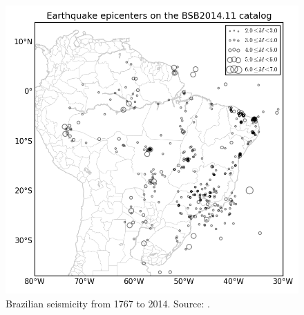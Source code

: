 \documentclass[grl]{agutex}
\begin{document}





\newpage


\begin{figure}
	\includegraphics[width=0.99\linewidth]{z_img_seismicity}
	\caption{Brazilian seismicity from 1767 to 2014. Source: \citep{bsb_2014}.}
	\label{fig_seismicity}
\end{figure}
\end{document}
